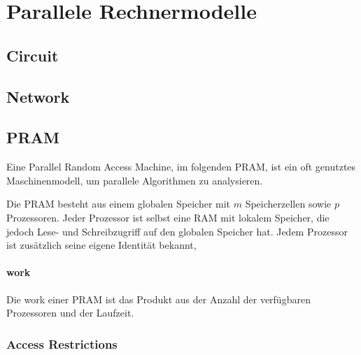 \section{Parallele Rechnermodelle}

\subsection{Circuit}

\subsection{Network}


\subsection{PRAM}
Eine Parallel Random Access Machine, im folgenden PRAM, ist ein oft genutztes Maschinenmodell, um parallele Algorithmen zu analysieren.

Die PRAM besteht aus einem globalen Speicher mit $m$ Speicherzellen sowie $p$ Prozessoren.
Jeder Prozessor ist selbst eine RAM mit lokalem Speicher, die jedoch Lese- und Schreibzugriff auf den globalen Speicher hat.
Jedem Prozessor ist zusätzlich seine eigene Identität bekannt,


\paragraph{work}
Die work einer PRAM ist das Produkt aus der Anzahl der verfügbaren Prozessoren und der Laufzeit.

\cite{reif}

\subsubsection{Access Restrictions}
